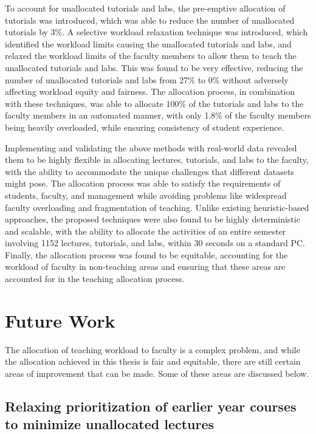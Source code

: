 To account for unallocated tutorials and labs, the pre-emptive allocation of tutorials was introduced, which was able to reduce the number of unallocated tutorials by 3\%. A selective workload relaxation technique was introduced, which identified the workload limits causing the unallocated tutorials and labs, and relaxed the workload limits of the faculty members to allow them to teach the unallocated tutorials and labs. This was found to be very effective, reducing the number of unallocated tutorials and labs from 27\% to 0\% without adversely affecting workload equity and fairness. The allocation process, in combination with these techniques, was able to allocate 100\% of the tutorials and labs to the faculty members in an automated manner, with only 1.8\% of the faculty members being heavily overloaded, while ensuring consistency of student experience.

Implementing and validating the above methods with real-world data revealed them to be highly flexible in allocating lectures, tutorials, and labs to the faculty, with the ability to accommodate the unique challenges that different datasets might pose. The allocation process was able to satisfy the requirements of students, faculty, and management while avoiding problems like widespread faculty overloading and fragmentation of teaching. Unlike existing heuristic-based approaches, the proposed techniques were also found to be highly deterministic and scalable, with the ability to allocate the activities of an entire semester involving 1152 lectures, tutorials, and labs, within 30 seconds on a standard PC. Finally, the allocation process was found to be equitable, accounting for the workload of faculty in non-teaching areas and ensuring that these areas are accounted for in the teaching allocation process.


\section{Future Work}

The allocation of teaching workload to faculty is a complex problem, and while the allocation achieved in this thesis is fair and equitable, there are still certain areas of improvement that can be made. Some of these areas are discussed below.

\subsection{Relaxing prioritization of earlier year courses to minimize unallocated lectures}

